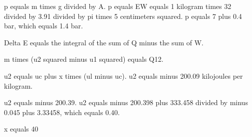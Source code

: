p equals m times g divided by A.  
p equals EW equals 1 kilogram times 32 divided by 3.91 divided by pi times 5 centimeters squared.  
p equals 7 plus 0.4 bar, which equals 1.4 bar.  

Delta E equals the integral of the sum of Q minus the sum of W.  

m times (u2 squared minus u1 squared) equals Q12.  

u2 equals uc plus x times (ul minus uc).  
u2 equals minus 200.09 kilojoules per kilogram.  

u2 equals minus 200.39.  
u2 equals minus 200.398 plus 333.458 divided by minus 0.045 plus 3.33458, which equals 0.40.  

x equals 40%